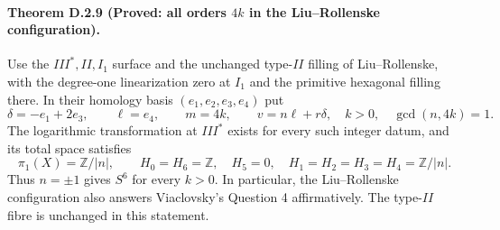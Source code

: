 \paragraph{Theorem D.2.9 (Proved: all orders $4k$ in the Liu--Rollenske configuration).}
Use the $III^*,II,I_1$ surface and the unchanged type-$II$
filling of Liu--Rollenske, with the degree-one linearization zero
at $I_1$ and the primitive hexagonal filling there.
In their homology basis $(e_1,e_2,e_3,e_4)$ put
\[
 \delta=-e_1+2e_3,\qquad \ell=e_4,\qquad
 m=4k,\qquad v=n\ell+r\delta,
 \quad k>0,\quad\gcd(n,4k)=1.
\]
The logarithmic transformation at $III^*$ exists for every
such integer datum, and its total space satisfies
\[
 \pi_1(X)=\mathbb Z/|n|,\qquad
 H_0=H_6=\mathbb Z,\quad H_5=0,\quad
 H_1=H_2=H_3=H_4=\mathbb Z/|n|.
\]
Thus $n=\pm1$ gives $S^6$ for every $k>0$. In particular,
the Liu--Rollenske configuration also answers Viaclovsky's
Question 4 affirmatively. The type-$II$ fibre is unchanged
in this statement.
